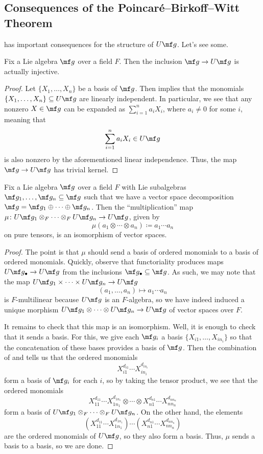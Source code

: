 \documentclass[../notes.tex]{subfiles}
\begin{document}
\subsection{Consequences of the Poincar\'e--Birkoff--Witt Theorem}
 has important consequences for the structure of $U\mf g$. Let's see some.
\begin{corollary}
	Fix a Lie algebra $\mf g$ over a field $F$. Then the inclusion $\mf g\to U\mf g$ is actually injective.
\end{corollary}
\begin{proof}
	Let $\{X_1,\ldots,X_n\}$ be a basis of $\mf g$. Then  implies that the monomials $\{X_1,\ldots,X_n\}\subseteq U\mf g$ are linearly independent. In particular, we see that any nonzero $X\in\mf g$ can be expanded as $\sum_{i=1}^na_iX_i$, where $a_i\ne0$ for some $i$, meaning that
	\[\sum_{i=1}^na_iX_i\in U\mf g\]
	is also nonzero by the aforementioned linear independence. Thus, the map $\mf g\to U\mf g$ has trivial kernel.
\end{proof}
\begin{corollary}
	Fix a Lie algebra $\mf g$ over a field $F$ with Lie subalgebras $\mf g_1,\ldots,\mf g_n\subseteq\mf g$ such that we have a vector space decomposition $\mf g=\mf g_1\oplus\cdots\oplus\mf g_n$. Then the ``multiplication'' map $\mu\colon U\mf g_1\otimes_F\cdots\otimes_F U\mf g_n\to U\mf g$, given by
	\[\mu(a_1\otimes\cdots\otimes a_n)\coloneqq a_1\cdots a_n\]
	on pure tensors, is an isomorphism of vector spaces.
\end{corollary}
\begin{proof}
	The point is that $\mu$ should send a basis of ordered monomials to a basis of ordered monomials. Quickly, observe that functoriality produces maps $U\mf g_\bullet\to U\mf g$ from the inclusions $\mf g_\bullet\subseteq\mf g$. As such, we may note that the map $U\mf g_1\times\cdots\times U\mf g_n\to U\mf g$
	\[(a_1,\ldots,a_n)\mapsto a_1\cdots a_n\]
	is $F$-multilinear because $U\mf g$ is an $F$-algebra, so we have indeed induced a unique morphism $U\mf g_1\otimes\cdots\otimes U\mf g_n\to U\mf g$ of vector spaces over $F$.

	It remains to check that this map is an isomorphism. Well, it is enough to check that it sends a basis. For this, we give each $\mf g_i$ a basis $\{X_{i1},\ldots,X_{in_i}\}$ so that the concatenation of these bases provides a basis of $\mf g$. Then the combination of  and  tells us that the ordered monomials
	\[X_{i1}^{d_{i1}}\cdots X_{in_i}^{d_{in_i}}\]
	form a basis of $\mf g_i$ for each $i$, so by taking the tensor product, we see that the ordered monomials
	\[X_{11}^{d_{11}}\cdots X_{1n_1}^{d_{1n_1}}\otimes\cdots\otimes X_{n1}^{d_{n1}}\cdots X_{nn_n}^{d_{nn_n}}\]
	form a basis of $U\mf g_1\otimes_F\cdots\otimes_F U\mf g_n$. On the other hand, the elements
	\[\left(X_{11}^{d_{11}}\cdots X_{1n_1}^{d_{1n_1}}\right)\cdots\left(X_{n1}^{d_{n1}}\cdots X_{nn_n}^{d_{nn_n}}\right)\]
	are the ordered monomials of $U\mf g$, so they also form a basis. Thus, $\mu$ sends a basis to a basis, so we are done.
\end{proof}
\end{document}
